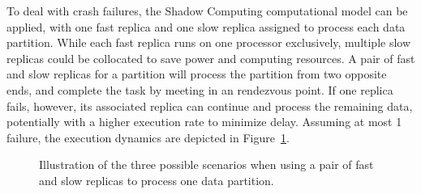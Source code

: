 
To deal with crash failures, the Shadow Computing computational model can be applied, with one fast replica and one slow replica assigned to process each data partition. While each fast replica runs on one processor exclusively, multiple slow replicas could be collocated to save power and computing resources. A pair of fast and slow replicas for a partition will process the partition from two opposite ends, and complete the task by meeting in an rendezvous point. If one replica fails, however, its associated replica can continue and process the remaining data, potentially with a higher execution rate to minimize delay. Assuming at most 1 failure, the execution dynamics are depicted in Figure~\ref{fig:crash_failure_model}. %

\begin{figure}[!t]
	\begin{center}
	\end{center}
	\caption{Illustration of the three possible scenarios when using a pair of fast and slow replicas to process one data partition.}
	\label{fig:crash_failure_model}
\end{figure}


